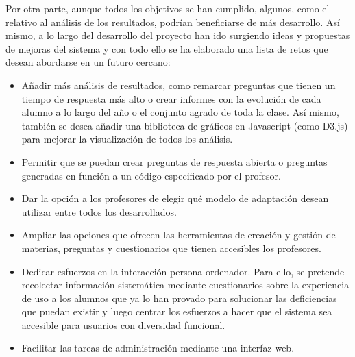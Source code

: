 Por otra parte, aunque todos los objetivos se han cumplido, algunos, como el relativo al análisis de los resultados, podrían beneficiarse de más desarrollo. Así mismo, a lo largo del desarrollo del proyecto han ido surgiendo ideas y propuestas de mejoras del sistema y con todo ello se ha elaborado una lista de retos que desean abordarse en un futuro cercano:

\begin{itemize}
	\item Añadir más análisis de resultados, como remarcar preguntas que tienen un tiempo de respuesta más alto o crear informes con la evolución de cada alumno a lo largo del año o el conjunto agrado de toda la clase. Así mismo, también se desea añadir una biblioteca de gráficos en Javascript (como D3.js) para mejorar la visualización de todos los análisis.
	\item Permitir que se puedan crear preguntas de respuesta abierta o preguntas generadas en función a un código especificado por el profesor.
	\item Dar la opción a los profesores de elegir qué modelo de adaptación desean utilizar entre todos los desarrollados.
	\item Ampliar las opciones que ofrecen las herramientas de creación y gestión de materias, preguntas y cuestionarios que tienen accesibles los profesores.
	\item Dedicar esfuerzos en la interacción persona-ordenador. Para ello, se pretende recolectar información sistemática mediante cuestionarios sobre la experiencia de uso a los alumnos que ya lo han provado para solucionar las deficiencias que puedan existir y luego centrar los esfuerzos a hacer que el sistema sea accesible para usuarios con diversidad funcional.
	\item Facilitar las tareas de administración mediante una interfaz web.
\end{itemize}
